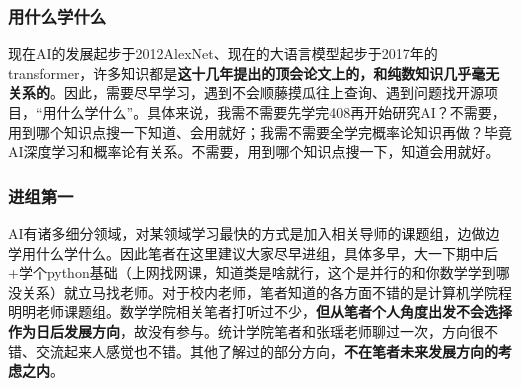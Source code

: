 \documentclass[12pt, a4paper, fontset=ubuntu]{ctexart}
\begin{document}
\subsubsection{用什么学什么}
现在AI的发展起步于2012AlexNet、现在的大语言模型起步于2017年的transformer，许多知识都是\textbf{这十几年提出的顶会论文上的，和纯数知识几乎毫无关系的}。因此，需要尽早学习，遇到不会顺藤摸瓜往上查询、遇到问题找开源项目，“用什么学什么”。具体来说，我需不需要先学完408再开始研究AI？不需要，用到哪个知识点搜一下知道、会用就好；我需不需要全学完概率论知识再做？毕竟AI深度学习和概率论有关系。不需要，用到哪个知识点搜一下，知道会用就好。
\subsubsection{进组第一}
AI有诸多细分领域，对某领域学习最快的方式是加入相关导师的课题组，边做边学用什么学什么。因此笔者在这里建议大家尽早进组，具体多早，大一下期中后+学个python基础（上网找网课，知道类是啥就行，这个是并行的和你数学学到哪没关系）就立马找老师。对于校内老师，笔者知道的各方面不错的是计算机学院程明明老师课题组。数学学院相关笔者打听过不少，\textbf{但从笔者个人角度出发不会选择作为日后发展方向}，故没有参与。统计学院笔者和张瑶老师聊过一次，方向很不错、交流起来人感觉也不错。其他了解过的部分方向，\textbf{不在笔者未来发展方向的考虑之内}。
\end{document}
